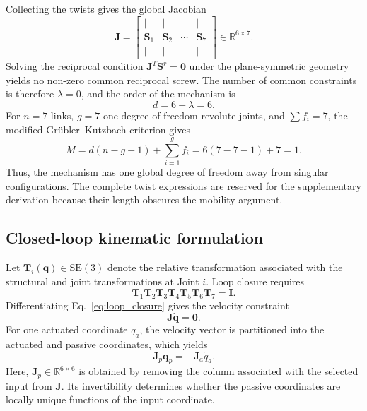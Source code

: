 \documentclass[a4paper,fleqn]{cas-sc}
\begin{document}
Collecting the twists gives the global Jacobian
\begin{equation}
\mathbf J=
\begin{bmatrix}
|&|&&|\\
\mathbf S_1&\mathbf S_2&\cdots&\mathbf S_7\\
|&|&&|
\end{bmatrix}\in\mathbb R^{6\times7}.
\label{eq:global_jacobian}
\end{equation}
Solving the reciprocal condition
\(\mathbf J^T\mathbf S^r=\mathbf 0\) under the plane-symmetric geometry yields
no non-zero common reciprocal screw. The number of common constraints is
therefore \(\lambda=0\), and the order of the mechanism is
\begin{equation}
d=6-\lambda=6.
\end{equation}
For \(n=7\) links, \(g=7\) one-degree-of-freedom revolute joints, and
\(\sum f_i=7\), the modified Gr\"ubler--Kutzbach criterion gives
\begin{equation}
M=d(n-g-1)+\sum_{i=1}^{g}f_i
  =6(7-7-1)+7=1.
\label{eq:mobility}
\end{equation}
Thus, the mechanism has one global degree of freedom away from singular
configurations. The complete twist expressions are reserved for the
supplementary derivation because their length obscures the mobility argument.

\subsection{Closed-loop kinematic formulation}

Let \(\mathbf T_i(\mathbf q)\in\mathrm{SE}(3)\) denote the relative
transformation associated with the structural and joint transformations at
Joint \(i\). Loop closure requires
\begin{equation}
\mathbf T_1\mathbf T_2\mathbf T_3\mathbf T_4
\mathbf T_5\mathbf T_6\mathbf T_7=\mathbf I.
\label{eq:loop_closure}
\end{equation}
Differentiating Eq.~\eqref{eq:loop_closure} gives the velocity constraint
\begin{equation}
\mathbf J\dot{\mathbf q}=\mathbf 0.
\label{eq:velocity_constraint}
\end{equation}
For one actuated coordinate \(q_a\), the velocity vector is partitioned into
the actuated and passive coordinates, which yields
\begin{equation}
\mathbf J_p\dot{\mathbf q}_p=-\mathbf J_a\dot q_a.
\label{eq:passive_jacobian}
\end{equation}
Here, \(\mathbf J_p\in\mathbb R^{6\times6}\) is obtained by removing the
column associated with the selected input from \(\mathbf J\). Its
invertibility determines whether the passive coordinates are locally unique
functions of the input coordinate.
\end{document}

